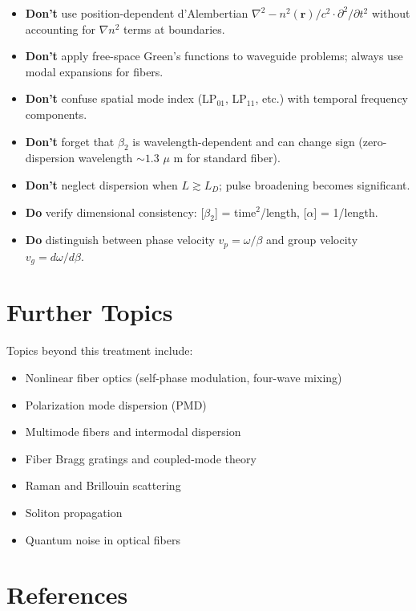 \documentclass[12pt,a4paper]{article}
\begin{document}
\begin{itemize}[leftmargin=*]
\item \textbf{Don't} use position-dependent d'Alembertian $\nabla^2 - n^2(\mathbf{r})/c^2 \cdot \partial^2/\partial t^2$ without accounting for $\nabla n^2$ terms at boundaries.

\item \textbf{Don't} apply free-space Green's functions to waveguide problems; always use modal expansions for fibers.

\item \textbf{Don't} confuse spatial mode index (LP$_{01}$, LP$_{11}$, etc.) with temporal frequency components.

\item \textbf{Don't} forget that $\beta_2$ is wavelength-dependent and can change sign (zero-dispersion wavelength $\sim 1.3$ $\mu$ m for standard fiber).

\item \textbf{Don't} neglect dispersion when $L \gtrsim L_D$; pulse broadening becomes significant.

\item \textbf{Do} verify dimensional consistency: [$\beta_2$] = time$^2$/length, [$\alpha$] = 1/length.

\item \textbf{Do} distinguish between phase velocity $v_p = \omega/\beta$ and group velocity $v_g = d\omega/d\beta$.
\end{itemize}

\section{Further Topics}

Topics beyond this treatment include:
\begin{itemize}[leftmargin=*]
\item Nonlinear fiber optics (self-phase modulation, four-wave mixing)
\item Polarization mode dispersion (PMD)
\item Multimode fibers and intermodal dispersion
\item Fiber Bragg gratings and coupled-mode theory
\item Raman and Brillouin scattering
\item Soliton propagation
\item Quantum noise in optical fibers
\end{itemize}

\section*{References}
\end{document}
